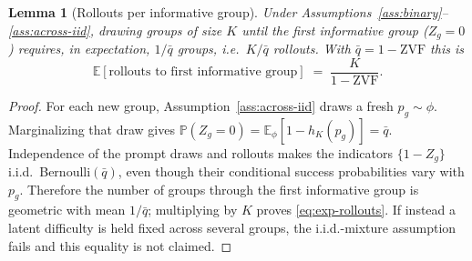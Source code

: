 \documentclass[11pt]{article}
\theoremstyle{plain}
\newtheorem{lemma}{Lemma}
\theoremstyle{definition}
\theoremstyle{remark}
\newcommand{\ZVF}{\ensuremath{\mathrm{ZVF}}}
\newcommand{\E}{\mathbb{E}}
\newcommand{\Prob}{\mathbb{P}}
\newcommand{\1}{\mathbb{1}}
\begin{document}
\begin{lemma}[Rollouts per informative group]\label{lem:rollouts-per-group}
Under Assumptions~\ref{ass:binary}--\ref{ass:across-iid}, drawing groups of
size $K$ until the first informative group ($Z_g=0$) requires, in expectation,
$1/\bar q$ groups, i.e.\ $K/\bar q$ rollouts. With $\bar q = 1-\ZVF$ this is
\begin{equation}\label{eq:exp-rollouts}
\E[\text{rollouts to first informative group}] \;=\; \frac{K}{1-\ZVF}.
\end{equation}
\end{lemma}
\begin{proof}
For each new group, Assumption~\ref{ass:across-iid} draws a fresh
$p_g\sim\phi$. Marginalizing that draw gives
$\Prob(Z_g=0)=\E_\phi[1-h_K(p_g)]=\bar q$. Independence of the prompt draws and
rollouts makes the indicators $\{1-Z_g\}$ i.i.d.\ Bernoulli$(\bar q)$, even
though their conditional success probabilities vary with $p_g$. Therefore the
number of groups through the first informative group is geometric with mean
$1/\bar q$; multiplying by $K$ proves \eqref{eq:exp-rollouts}. If instead a
latent difficulty is held fixed across several groups, the i.i.d.-mixture
assumption fails and this equality is not claimed.
\end{proof}
\end{document}
